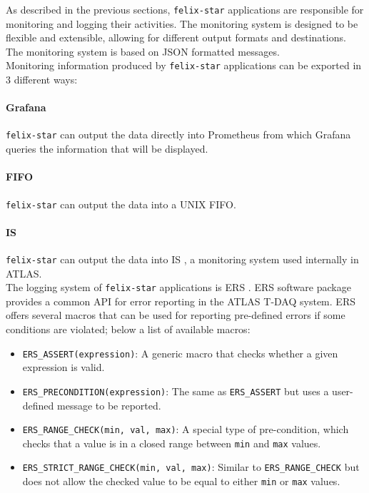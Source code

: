 As described in the previous sections, \texttt{felix-star} applications are responsible for monitoring and logging their activities. The monitoring system is designed to be flexible and extensible, allowing for different output formats and destinations.\\
The monitoring system is based on JSON formatted messages.\\
Monitoring information produced by \texttt{felix-star} applications can be exported in 3 different ways:

\paragraph{Grafana} \texttt{felix-star} can output the data directly into Prometheus \cite{prometheus} from which Grafana \cite{grafana} queries the information that will be displayed.

\paragraph{FIFO} \texttt{felix-star} can output the data into a UNIX FIFO.

\paragraph{\ac{IS}} \texttt{felix-star} can output the data into \acs{IS} \cite{is}, a monitoring system used internally in \acs{ATLAS}.\\

The logging system of \texttt{felix-star} applications is \acf{ERS} \cite{ers}. \acs{ERS} software package provides a common \acs{API} for error reporting in the \acs{ATLAS} \acs{T-DAQ} system. \acs{ERS} offers several macros that can be used for reporting pre-defined errors if some conditions are violated; below a list of available macros:

\begin{itemize}
    \item \texttt{ERS\_ASSERT(expression)}: A generic macro that checks whether a given expression is valid.
    \item \texttt{ERS\_PRECONDITION(expression)}: The same as \texttt{ERS\_ASSERT} but uses a user-defined message to be reported.
    \item \texttt{ERS\_RANGE\_CHECK(min, val, max)}: A special type of pre-condition, which checks that a value is in a closed range between \texttt{min} and \texttt{max} values.
    \item \texttt{ERS\_STRICT\_RANGE\_CHECK(min, val, max)}: Similar to \texttt{ERS\_RANGE\_CHECK} but does not allow the checked value to be equal to either \texttt{min} or \texttt{max} values.
\end{itemize}

